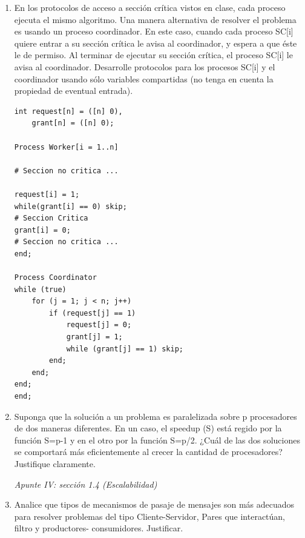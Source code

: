 \documentclass[a4paper, 10pt]{article}
\newenvironment{QandA}{
    \begin{enumerate}\bfseries}
    {\end{enumerate}
}
\newenvironment{answered}{\par\normalfont}{}
\begin{document}
\begin{QandA}
\begin{enumerate}
\begin{answered}
\end{answered}

\item Indique que mecanismo de pasaje de mensajes utilizaría. Justifique.

\begin{answered}
En mi opinión, utilizaría PMA. Particularmente, porque su primitiva \lstinline{send} no es bloqueante. Esto nos evita demoras innecesarias al momento de propagar el valor de un proceso, en particular con $n$ muy grandes.    
\end{answered}


\end{enumerate}


\item En los protocolos de acceso a sección crítica vistos en clase, cada proceso ejecuta el mismo algoritmo. Una manera alternativa de resolver el problema es usando un proceso coordinador. En este caso, cuando cada
proceso SC[i] quiere entrar a su sección crítica le avisa al coordinador, y espera a que éste le de permiso. Al
terminar de ejecutar su sección crítica, el proceso SC[i] le avisa al coordinador.
Desarrolle protocolos para los procesos SC[i] y el coordinador usando sólo variables compartidas (no
tenga en cuenta la propiedad de eventual entrada).

\begin{lstlisting}[multicols=2]
int request[n] = ([n] 0),
    grant[n] = ([n] 0);

Process Worker[i = 1..n]
    
# Seccion no critica ...

request[i] = 1;
while(grant[i] == 0) skip;
# Seccion Critica
grant[i] = 0;
# Seccion no critica ...
end;

Process Coordinator
while (true)
    for (j = 1; j < n; j++)
        if (request[j] == 1)
            request[j] = 0;
            grant[j] = 1;
            while (grant[j] == 1) skip;
        end;
    end;
end;
end;
\end{lstlisting}


\item Suponga que la solución a un problema es paralelizada sobre p procesadores de dos maneras diferentes.
En un caso, el speedup (S) está regido por la función S=p-1 y en el otro por la función S=p/2. ¿Cuál de las
dos soluciones se comportará más eficientemente al crecer la cantidad de procesadores? Justifique
claramente.
\begin{answered}
    \emph{Apunte IV: sección 1.4 (Escalabilidad)}
\end{answered}


\item Analice que tipos de mecanismos de pasaje de mensajes son más adecuados para resolver problemas del tipo Cliente-Servidor, Pares que interactúan, filtro y productores- consumidores. Justificar.
\end{QandA}
\end{document}
